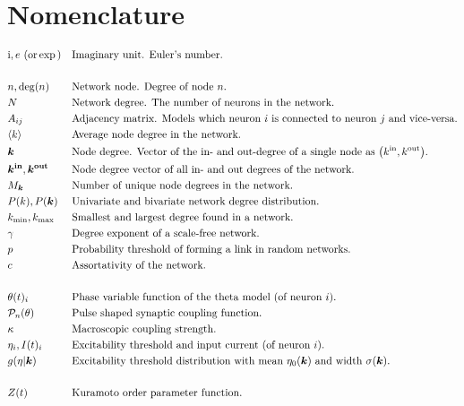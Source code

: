 \newpage
\section{Nomenclature}
\vspace{-.5cm}
\begin{alignat*}{2}
& \ic, e \text{ (or} \exp\text{)} &&\text{Imaginary unit. Euler's number.}\\ \\
& n, \degree(n) &&\text{Network node. Degree of node $n$.}\\
& N &&\text{Network degree. The number of neurons in the network.}\\
& A_{ij} &&\text{Adjacency matrix. Models which neuron $i$ is connected to neuron $j$ and vice-versa.}\\
& \kmean &&\text{Average node degree in the network.}\\
& \k &&\text{Node degree. Vector of the in- and out-degree of a single node as $\left(\kin, \kout \right)$.}\\
& \kinb, \koutb && \text{Node degree vector of all in- and out degrees of the network.} \\
& M_{\k} &&\text{Number of unique node degrees in the network.}\\
& P(k), P(\k) &&\text{Univariate and bivariate network degree distribution.}\\
&\kmin, \kmax &&\text{Smallest and largest degree found in a network.}\\ 
&\gamma &&\text{Degree exponent of a scale-free network.}\\ 
&p &&\text{Probability threshold of forming a link in random networks.}\\ 
&c &&\text{Assortativity of the network.}\\ \\
&\theta(t)_i &&\text{Phase variable function of the theta model (of neuron $i$).}\\
& \Pulse_n (\theta)&&\text{Pulse shaped synaptic coupling function.}\\
&\kappa &&\text{Macroscopic coupling strength.}\\
&\eta_i, I(t)_i &&\text{Excitability threshold and input current (of neuron $i$).}\\
&g(\eta \rvert \k) \quad &&\text{Excitability threshold distribution with mean $\eta_0(\k)$ and width $\sigma(\k)$.}\\ \\
& Z(t) &&\text{Kuramoto order parameter function.}\\

\end{alignat*}
